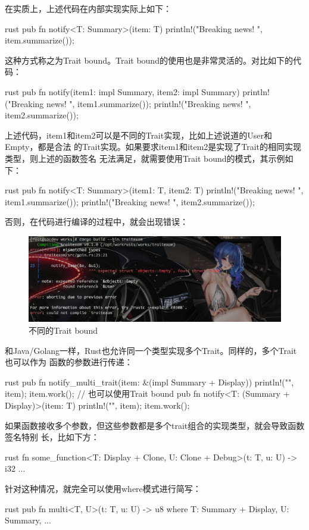 在实质上，上述代码在内部实现实际上如下：
\begin{code-block}{rust}
pub fn notify<T: Summary>(item: T) {
    println!("Breaking news! {}", item.summarize());
}
\end{code-block}
这种方式称之为Trait bound。Trait bound的使用也是非常灵活的。对比如下的代码：
\begin{code-block}{rust}
pub fn notify(item1: impl Summary, item2: impl Summary) {
    println!("Breaking news! {}", item1.summarize());
    println!("Breaking news! {}", item2.summarize());
}
\end{code-block}
上述代码，item1和item2可以是不同的Trait实现，比如上述说道的User和Empty，都是合法
的Trait实现。如果要求item1和item2是实现了Trait的相同实现类型，则上述的函数签名
无法满足，就需要使用Trait bound的模式，其示例如下：
\begin{code-block}{rust}
pub fn notify<T: Summary>(item1: T, item2: T) {
    println!("Breaking news! {}", item1.summarize());
    println!("Breaking news! {}", item2.summarize());
}
\end{code-block}
否则，在代码进行编译的过程中，就会出现错误：
\begin{figure}[H]
  \centering
  \includegraphics[width=\linewidth]{rust_trait_bound.png}
  \caption{不同的Trait bound}
  \label{fig:rust_trait_bound}
\end{figure}

和Java/Golang一样，Rust也允许同一个类型实现多个Trait。同样的，多个Trait也可以作为
函数的参数进行传递：
\begin{code-block}{rust}
pub fn notify_multi_trait(item: &(impl Summary + Display)) {
    println!("{}", item);
    item.work();
}
// 也可以使用Trait bound
pub fn notify<T: (Summary + Display)>(item: T) {
    println!("{}", item);
    item.work();
}
\end{code-block}

如果函数接收多个参数，但这些参数都是多个trait组合的实现类型，就会导致函数签名特别
长，比如下方：
\begin{code-block}{rust}
fn some_function<T: Display + Clone, U: Clone + Debug>(t: T, u: U) -> i32 {
    ...
}
\end{code-block}
针对这种情况，就完全可以使用where模式进行简写：
\begin{code-block}{rust}
pub fn multi<T, U>(t: T, u: U) -> u8
where
    T: Summary + Display,
    U: Summary,
{
    ...
}
\end{code-block}


